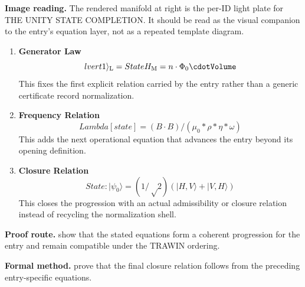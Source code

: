 \begin{samepage}
\noindent\begin{minipage}[t]{0.45\linewidth}
\vspace{0pt}
\raggedright
\scriptsize\textbf{Image reading.} The rendered manifold at right is the per-ID light plate for THE UNITY STATE COMPLETION. It should be read as the visual companion to the entry's equation layer, not as a repeated template diagram.\par
\end{minipage}\hfill
\begin{minipage}[t]{0.53\linewidth}
\vspace*{-0.10in}
\raggedright
{}
\end{minipage}
\end{samepage}

\clearpage


\begin{enumerate}[leftmargin=1.6em,itemsep=9pt,topsep=6pt]
\item \textbf{Generator Law}
\[
lvert 1 \rangle_{\mathrm{L}} = State H_{\mathrm{M}} = n\cdot\Phi_0\cdotVolume
\]
This fixes the first explicit relation carried by the entry rather than a generic certificate record normalization.

\item \textbf{Frequency Relation}
\[
Lambda[state] = (B \cdot B)/(\mu_0 * \rho * \eta * \omega)
\]
This adds the next operational equation that advances the entry beyond its opening definition.

\item \textbf{Closure Relation}
\[
State: \lvert \psi_0 \rangle = (1/√2)(\lvert H,V \rangle + \lvert V,H \rangle)
\]
This closes the progression with an actual admissibility or closure relation instead of recycling the normalization shell.
\end{enumerate}

\textbf{Proof route.} show that the stated equations form a coherent progression for the entry and remain compatible under the TRAWIN ordering.

\textbf{Formal method.} prove that the final closure relation follows from the preceding entry-specific equations.

\medskip
{}

